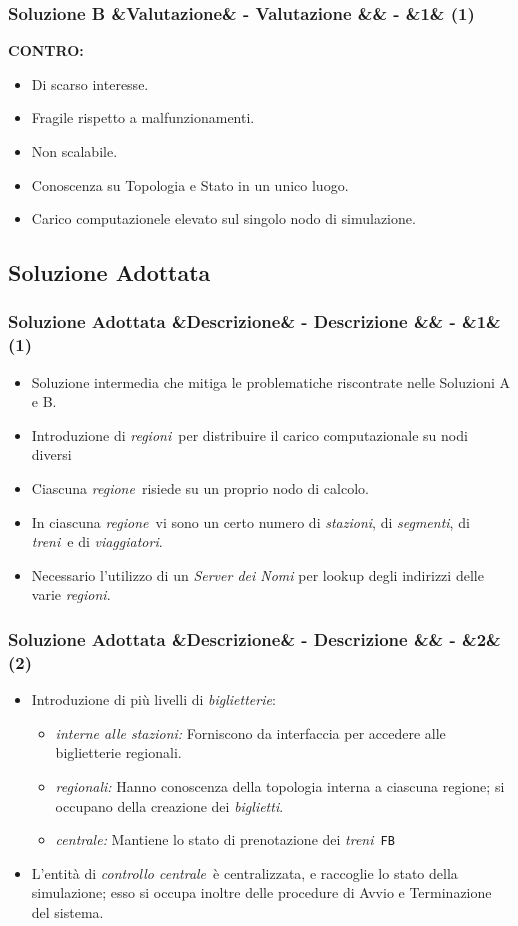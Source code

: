 \documentclass[slidestop,compress,blackandwhite]{beamer}
\newcommand{\ttt}[1]{\texttt{#1}}
\newcommand{\ii}[1]{\textit{#1}}
\newcommand{\treni}{\ii{treni}}
\newcommand{\viaggiatori}{\ii{viaggiatori}}
\newcommand{\stazioni}{\ii{stazioni}}
\newcommand{\tickets}{\ii{biglietti}}
\newcommand{\segmenti}{\ii{segmenti}}
\newcommand{\biglietterie}{\ii{biglietterie}}
\newcommand{\controller}{\ii{controllo centrale}}
\newcommand{\regione}{\ii{regione}}
\newcommand{\regioni}{\ii{regioni}}
\newcommand{\CONTRO}{\textbf{CONTRO:}}
\newcommand{\newtitle}[4]{
	#1 
	\ifx&#2&%
	\else
  		\large- #2
	\fi
	\ifx&#3&%
	\else
  		\normalsize- #3
	\fi
	\ifx&#4&%
	\else
  		\normalsize (#4)
	\fi
}
\newcommand{\newframe}[5]{
	\begin{frame}
		\frametitle{\newtitle{#1}{#2}{#3}{#4}}
		#5
	\end{frame}
}
\newcommand{\myitemize}[1]{\begin{itemize}#1\end{itemize}}
\begin{document}
	
	\newframe{Soluzione B}{Valutazione}{}{1}{
		\vspace{0.5cm}
		\CONTRO
			\begin{itemize}
				\item Di scarso interesse.
				\item Fragile rispetto a malfunzionamenti.
				\item Non scalabile.
				\item Conoscenza su Topologia e Stato in un unico luogo.
				\item Carico computazionele elevato sul singolo nodo di simulazione.
			\end{itemize}
	}
	
	\subsection{Soluzione Adottata}
	
	\newframe{Soluzione Adottata}{Descrizione}{}{1}{
		\vspace{0.5cm}
		\begin{itemize}
			\item Soluzione intermedia che mitiga le problematiche riscontrate nelle Soluzioni A e B.
			\item Introduzione di \regioni~per distribuire il carico computazionale su nodi diversi
			\item Ciascuna \regione~risiede su un proprio nodo di calcolo.
			\item In ciascuna \regione~vi sono un certo numero di \stazioni, di \segmenti, di \treni~e di \viaggiatori.
			\item Necessario l'utilizzo di un \ii{Server dei Nomi} per lookup degli indirizzi delle varie \regioni.
		\end{itemize}
	
	}
	
	\newframe{Soluzione Adottata}{Descrizione}{}{2}{
		\vspace{0.5cm}
		\myitemize{
			\item Introduzione di più livelli di \biglietterie:
				\myitemize{
					\item \ii{interne alle stazioni:} Forniscono da interfaccia per accedere alle biglietterie regionali.
					\item \ii{regionali:} Hanno conoscenza della topologia interna a ciascuna regione; si occupano della creazione dei \tickets.
					\item \ii{centrale:} Mantiene lo stato di prenotazione dei \treni~\ttt{FB}
				}
			\item L'entità di \controller~è centralizzata, e raccoglie lo stato della simulazione; esso si occupa inoltre delle procedure di Avvio e Terminazione del sistema.
		}
	}
	
\end{document}
